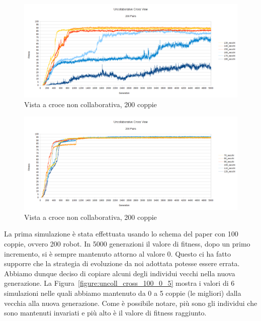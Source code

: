\begin{figure}[ht]
	\centering
	\includegraphics[scale=0.7,angle=90]{imgs/uncollaborative_cross_200_pairs_130_180_vecchi.png}
	\caption{Vista a croce non collaborativa, 200 coppie}
	\label{figure:uncoll_cross_200_130_180}
\end{figure}
\begin{figure}[ht]
	\centering
	\includegraphics[scale=0.7,angle=90]{imgs/uncollaborative_cross_200_pairs_70_120_vecchi_solo_nuovi_mutati.png}
	\caption{Vista a croce non collaborativa, 200 coppie}
	\label{figure:uncoll_cross_200_70_120_vecchi_non_mutati}
\end{figure}
La prima simulazione è stata effettuata usando lo schema del paper con 100
coppie, ovvero 200 robot. In 5000 generazioni il valore di fitness, dopo un
primo incremento, si è sempre mantenuto attorno al valore 0. Questo ci ha fatto
supporre che la strategia di evoluzione da noi adottata potesse essere errata.
Abbiamo dunque deciso di copiare alcuni degli individui vecchi nella nuova
generazione.\newline
La Figura~\ref{figure:uncoll_cross_100_0_5} mostra i valori di 6 simulazioni
nelle quali abbiamo mantenuto da 0 a 5 coppie (le migliori) dalla vecchia alla
nuova generazione. Come è possibile notare, più sono gli individui che sono
mantenuti invariati e più alto è il valore di fitness raggiunto.\newline
